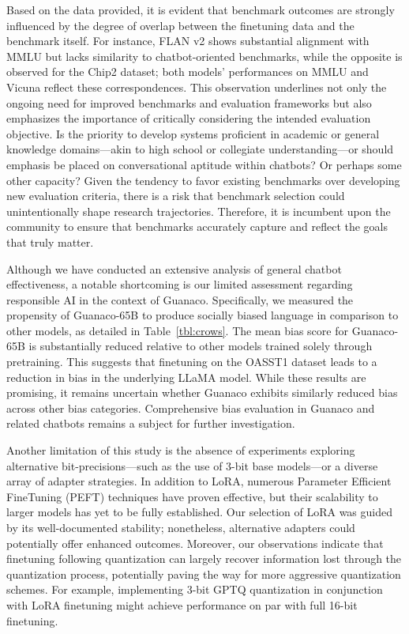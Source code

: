 Based on the data provided, it is evident that benchmark outcomes are strongly influenced by the degree of overlap between the finetuning data and the benchmark itself. For instance, FLAN v2 shows substantial alignment with MMLU but lacks similarity to chatbot-oriented benchmarks, while the opposite is observed for the Chip2 dataset; both models' performances on MMLU and Vicuna reflect these correspondences. This observation underlines not only the ongoing need for improved benchmarks and evaluation frameworks but also emphasizes the importance of critically considering the intended evaluation objective. Is the priority to develop systems proficient in academic or general knowledge domains—akin to high school or collegiate understanding—or should emphasis be placed on conversational aptitude within chatbots? Or perhaps some other capacity? Given the tendency to favor existing benchmarks over developing new evaluation criteria, there is a risk that benchmark selection could unintentionally shape research trajectories. Therefore, it is incumbent upon the community to ensure that benchmarks accurately capture and reflect the goals that truly matter.

Although we have conducted an extensive analysis of general chatbot effectiveness, a notable shortcoming is our limited assessment regarding responsible AI in the context of {Guanaco}. Specifically, we measured the propensity of {Guanaco}-65B to produce socially biased language in comparison to other models, as detailed in Table~\ref{tbl:crows}. The mean bias score for {Guanaco}-65B is substantially reduced relative to other models trained solely through pretraining. This suggests that finetuning on the OASST1 dataset leads to a reduction in bias in the underlying LLaMA model. While these results are promising, it remains uncertain whether {Guanaco} exhibits similarly reduced bias across other bias categories. Comprehensive bias evaluation in {Guanaco} and related chatbots remains a subject for further investigation.

Another limitation of this study is the absence of experiments exploring alternative bit-precisions—such as the use of 3-bit base models—or a diverse array of adapter strategies. In addition to LoRA, numerous Parameter Efficient FineTuning (PEFT) techniques have proven effective, but their scalability to larger models has yet to be fully established. Our selection of LoRA was guided by its well-documented stability; nonetheless, alternative adapters could potentially offer enhanced outcomes. Moreover, our observations indicate that finetuning following quantization can largely recover information lost through the quantization process, potentially paving the way for more aggressive quantization schemes. For example, implementing 3-bit GPTQ quantization in conjunction with LoRA finetuning might achieve performance on par with full 16-bit finetuning.

